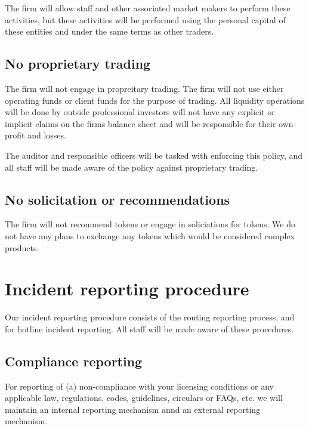 The firm will allow staff and other associated market makers to
perform these activities, but these activities will be performed using
the personal capital of these entities and under the same terms as
other traders.

\subsection{No proprietary trading}

The firm will not engage in propreitary trading.  The firm will not
use either operating funds or client funds for the purpose of
trading.  All liquidity operations will be done by outside
professional investors will not have any explicit or implicit claims
on the firms balance sheet and will be responsible for their own
profit and losses.

The auditor and responsible officers will be tasked with enforcing
this policy, and all staff will be made aware of the policy against
proprietary trading.

\subsection{No solicitation or recommendations}
The firm will not recommend tokens or engage in soliciations for
tokens.  We do not have any plans to exchange any tokens which would
be considered complex products.

\section{Incident reporting procedure}

Our incident reporting procedure consists of the routing reporting
process, and for hotline incident reporting.  All staff will be
made aware of these procedures.

\subsection{Compliance reporting}

For reporting of (a) non-compliance with your licensing conditions or
any applicable law, regulations, codes, guidelines, circulars or
FAQs, etc. we will maintain an internal reporting mechanism annd an
external reporting mechanism.

